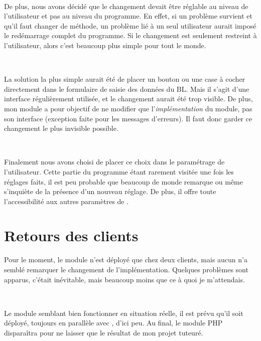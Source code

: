 ~

De plus, nous avons décidé que le changement devait être réglable au niveau de l'utilisateur et pas au niveau du programme. En effet, si un problème survient et qu'il faut changer de méthode, un problème lié à un seul utilisateur aurait imposé le redémarrage complet du programme. Si le changement est seulement restreint à l'utilisateur, alors c'est beaucoup plus simple pour tout le monde.

~

La solution la plus simple aurait été de placer un bouton ou une case à cocher directement dans le formulaire de saisie des données du BL. Mais il s'agit d'une interface régulièrement utilisée, et le changement aurait été trop visible. De plus, mon module a pour objectif de ne modifier que l'\emph{implémentation} du module, pas son interface (exception faite pour les messages d'erreurs). Il faut donc garder ce changement le plus invisible possible.

~

Finalement nous avons choisi de placer ce choix dans le paramétrage de l'utilisateur. Cette partie du programme étant rarement visitée une fois les réglages faits, il est peu probable que beaucoup de monde remarque ou même s'inquiète de la présence d'un nouveau réglage. De plus, il offre toute l'accessibilité aux autres paramètres de \integrale.


\section{Retours des clients}
Pour le moment, le module n'est déployé que chez deux clients, mais aucun n'a semblé remarquer le changement de l'implémentation. Quelques problèmes sont apparus, c'était inévitable, mais beaucoup moins que ce à quoi je m'attendais.

~

Le module semblant bien fonctionner en situation réelle, il est prévu qu'il soit déployé, toujours en parallèle avec \pireus{}, d'ici peu. Au final, le module PHP disparaîtra pour ne laisser que le résultat de mon projet tuteuré.
